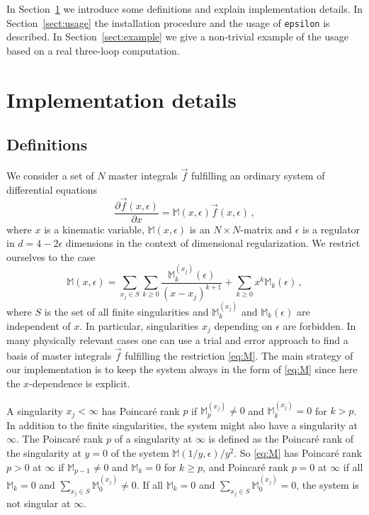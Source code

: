 \documentclass[12pt]{article}
\numberwithin{equation}{section}
\numberwithin{figure}{section}
\newcommand{\M}{\mathds{M}}
\begin{document}
    In Section~\ref{sect:impl} we introduce some definitions and explain implementation details.
    In Section~\ref{sect:usage} the installation procedure and the usage of \texttt{epsilon} is described.
    In Section~\ref{sect:example} we give a non-trivial example of the usage based on a real three-loop computation.
  \section{Implementation details} \label{sect:impl}
    \subsection{Definitions}
      We consider a set of $N$ master integrals $\vec{f}$ fulfilling an ordinary system of differential equations
      \begin{equation} \label{eq:system}
        \frac{\partial \vec{f}(x,\epsilon)}{\partial x} 
        = 
        \M(x,\epsilon) \vec{f}(x,\epsilon)\,,
      \end{equation}
      where $x$ is a kinematic variable, $\M(x,\epsilon)$ is an $N\times N$-matrix and $\epsilon$ is a regulator in $d = 4-2\epsilon$ dimensions in the context of dimensional regularization.
      We restrict ourselves to the case
      \begin{equation} \label{eq:M}
        \M(x,\epsilon) 
        = 
        \sum\limits_{x_j \in S} 
        \sum\limits_{k\geq0} 
        \frac{\M^{(x_j)}_k(\epsilon)}{(x-x_j)^{k+1}} 
        + 
        \sum\limits_{k\geq 0} 
        x^k 
        \M_k(\epsilon)\,,
      \end{equation}
      where $S$ is the set of all finite singularities and $\M^{(x_j)}_k$ and $\M_k(\epsilon)$ are independent of $x$.
      In particular, singularities $x_j$ depending on $\epsilon$ are forbidden.
      In many physically relevant cases one can use a trial and error approach to find a basis of master integrals $\vec{f}$ fulfilling the restriction \eqref{eq:M}.
      The main strategy of our implementation is to keep the system always in the form of \eqref{eq:M} since here the $x$-dependence is explicit.

      A singularity $x_j<\infty$ has Poincar\'{e} rank $p$ if $\M^{(x_j)}_p \neq 0$ and $\M^{(x_j)}_k = 0$ for $k>p$.
      In addition to the finite singularities, the system might also have a singularity at $\infty$.
      The Poincar\'{e} rank $p$ of a singularity at $\infty$ is defined as the Poincar\'{e} rank of the singularity at $y=0$ of the system $\M(1/y,\epsilon)/y^2$.
      So \eqref{eq:M} has Poincar\'{e} rank $p>0$ at $\infty$ if $\M_{p-1} \neq 0$ and $\M_k = 0$ for $k\geq p$, and Poincar\'{e} rank $p=0$ at $\infty$ if all $\M_k = 0$ and $\sum_{x_j\in S} \M^{(x_j)}_0 \neq 0$.
      If all $\M_k = 0$ and $\sum_{x_j\in S} \M^{(x_j)}_0 = 0$, the system is not singular at $\infty$.
\end{document}
